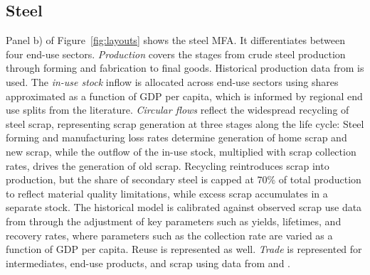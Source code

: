\documentclass[pdflatex]{sn-jnl}
\begin{document}
\subsection{Steel}\label{sec:steel}
Panel b) of Figure~\ref{fig:layouts} shows the steel MFA. It differentiates between four end-use sectors. \textit{Production} covers the stages from crude steel production through forming and fabrication to final goods. Historical production data from \textcite{worldsteelassociation2023} is used. The \textit{in-use stock} inflow is allocated across end-use sectors using shares approximated as a function of GDP per capita, which is informed by regional end use splits from the literature. \textit{Circular flows} reflect the widespread recycling of steel scrap, representing scrap generation at three stages along the life cycle: Steel forming and manufacturing loss rates \parencite{cullen2012} determine generation of home scrap and new scrap, while the outflow of the in-use stock, multiplied with scrap collection rates, drives the generation of old scrap. Recycling reintroduces scrap into production, but the share of secondary steel is capped at 70\% of total production to reflect material quality limitations, while excess scrap accumulates in a separate stock. The historical model is calibrated against observed scrap use data from \textcite{bureauofinternationalrecyclingaisbl2023} through the adjustment of key parameters such as yields, lifetimes, and recovery rates, where parameters such as the collection rate are varied as a function of GDP per capita. Reuse is represented as well. \textit{Trade} is represented for intermediates, end-use products, and scrap using data from \textcite{worldsteelassociation2023} and \textcite{gaulier2010}.
\end{document}
